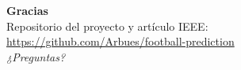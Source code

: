\documentclass[aspectratio=169]{beamer}
\begin{document}
\begin{frame}[plain]
  \centering
  \vfill
  {\Large \textbf{Gracias}}\\[1em]
  Repositorio del proyecto y artículo IEEE:\\[0.3em]
  \url{https://github.com/Arbues/football-prediction}\\[1em]
  \emph{¿Preguntas?}
  \vfill
\end{frame}
\end{document}
